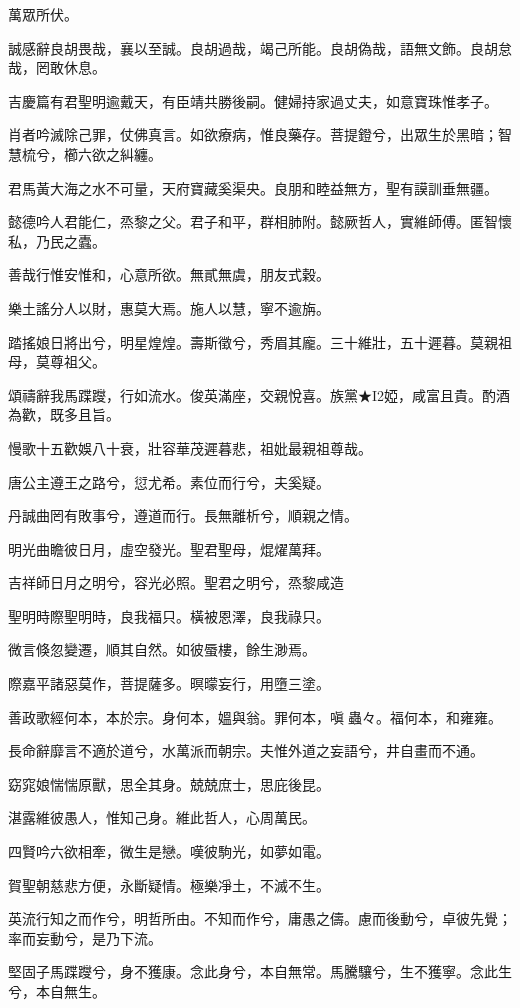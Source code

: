 \begin{pinyinscope}
萬眾所伏。

誠感辭良胡畏哉，襄以至誠。良胡過哉，竭己所能。良胡偽哉，語無文飾。良胡怠哉，罔敢休息。

吉慶篇有君聖明逾戴天，有臣靖共勝後嗣。健婦持家過丈夫，如意寶珠惟孝子。

肖者吟滅除己罪，仗佛真言。如欲療病，惟良藥存。菩提鐙兮，出眾生於黑暗；智慧梳兮，櫛六欲之糾纏。

君馬黃大海之水不可量，天府寶藏奚渠央。良朋和睦益無方，聖有謨訓垂無疆。

懿德吟人君能仁，烝黎之父。君子和平，群相肺附。懿厥哲人，實維師傅。匿智懷私，乃民之蠹。

善哉行惟安惟和，心意所欲。無貳無虞，朋友式穀。

樂土謠分人以財，惠莫大焉。施人以慧，寧不逾旃。

踏搖娘日將出兮，明星煌煌。壽斯徵兮，秀眉其龐。三十維壯，五十遲暮。莫親祖母，莫尊祖父。

頌禱辭我馬蹀躞，行如流水。俊英滿座，交親悅喜。族黨★I2婭，咸富且貴。酌酒為歡，既多且旨。

慢歌十五歡娛八十衰，壯容華茂遲暮悲，祖妣最親祖尊哉。

唐公主遵王之路兮，愆尤希。素位而行兮，夫奚疑。

丹誠曲罔有敗事兮，遵道而行。長無離析兮，順親之情。

明光曲瞻彼日月，虛空發光。聖君聖母，焜燿萬拜。

吉祥師日月之明兮，容光必照。聖君之明兮，烝黎咸造

聖明時際聖明時，良我福只。橫被恩澤，良我祿只。

微言倏忽變遷，順其自然。如彼蜃樓，餘生渺焉。

際嘉平諸惡莫作，菩提薩多。暝曚妄行，用墮三塗。

善政歌經何本，本於宗。身何本，媼與翁。罪何本，嗔蟲々。福何本，和雍雍。

長命辭靡言不適於道兮，水萬派而朝宗。夫惟外道之妄語兮，井自畫而不通。

窈窕娘惴惴原獸，思全其身。兢兢庶士，思庇後昆。

湛露維彼愚人，惟知己身。維此哲人，心周萬民。

四賢吟六欲相牽，微生是戀。嘆彼駒光，如夢如電。

賀聖朝慈悲方便，永斷疑情。極樂凈土，不滅不生。

英流行知之而作兮，明哲所由。不知而作兮，庸愚之儔。慮而後動兮，卓彼先覺；率而妄動兮，是乃下流。

堅固子馬蹀躞兮，身不獲康。念此身兮，本自無常。馬騰驤兮，生不獲寧。念此生兮，本自無生。


\end{pinyinscope}
